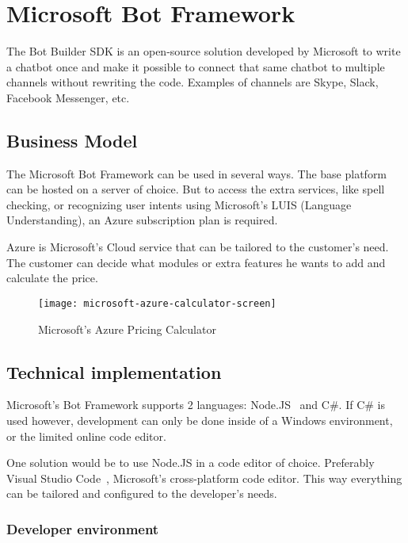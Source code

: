 \chapter{Microsoft Bot Framework}

The Bot Builder SDK is an open-source solution developed by Microsoft to write a chatbot once and make it possible to connect that same chatbot to multiple channels without rewriting the code. Examples of channels are Skype, Slack, Facebook Messenger, etc.

\section{Business Model}

The Microsoft Bot Framework can be used in several ways. The base platform can be hosted on a server of choice. But to access the extra services, like spell checking, or recognizing user intents using Microsoft's LUIS (Language Understanding), an Azure subscription plan is required.

Azure is Microsoft's Cloud service that can be tailored to the customer's need. The customer can decide what modules or extra features he wants to add and calculate the price.

\begin{figure}[ht]
	\centering
	\texttt{[image: microsoft-azure-calculator-screen]}
	\caption{Microsoft's Azure Pricing Calculator~\cite{azure-pricing-calculator}}
	\label{fig:microsoft-azure-calculator-screen}
\end{figure}

\section{Technical implementation}

Microsoft's Bot Framework supports 2 languages: Node.JS~\cite{node-js} and C\#. If C\# is used however, development can only be done inside of a Windows environment, or the limited online code editor.

One solution would be to use Node.JS in a code editor of choice. Preferably Visual Studio Code~\cite{visual-studio-code}, Microsoft's cross-platform code editor. This way everything can be tailored and configured to the developer's needs.

\subsection{Developer environment}

